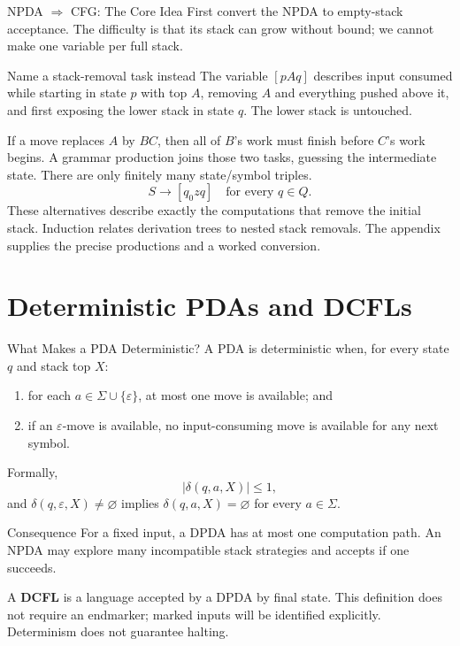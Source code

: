 \documentclass[10pt]{beamer}
\begin{document}
\begin{frame}{NPDA $\Rightarrow$ CFG: The Core Idea}
  \small
  First convert the NPDA to empty-stack acceptance. The difficulty is that
  its stack can grow without bound; we cannot make one variable per full stack.
  \begin{block}{Name a stack-removal task instead}
    The variable $[pAq]$ describes input consumed while starting in state $p$
    with top $A$, removing $A$ and everything pushed above it, and first
    exposing the lower stack in state $q$. The lower stack is untouched.
  \end{block}
  \pause
  If a move replaces $A$ by $BC$, then all of $B$'s work must finish before
  $C$'s work begins. A grammar production joins those two tasks, guessing
  the intermediate state. There are only finitely many state/symbol triples.
  \pause
  \[
    S\to[q_0zq]\quad\text{for every }q\in Q.
  \]
  These alternatives describe exactly the computations that remove the
  initial stack. Induction relates derivation trees to nested stack removals.
  The appendix supplies the precise productions and a worked conversion.
\end{frame}

\section{Deterministic PDAs and DCFLs}

\begin{frame}{What Makes a PDA Deterministic?}
  \small
  A PDA is deterministic when, for every state $q$ and stack top $X$:
  \begin{enumerate}
    \item for each $a\in\Sigma\cup\{\varepsilon\}$, at most one move is available; and
    \item if an $\varepsilon$-move is available, no input-consuming move is available for any next symbol.
  \end{enumerate}
  \pause
  Formally,
  \[
    |\delta(q,a,X)|\le1,
  \]
  and $\delta(q,\varepsilon,X)\ne\varnothing$ implies
  $\delta(q,a,X)=\varnothing$ for every $a\in\Sigma$.
  \pause
  \begin{block}{Consequence}
    For a fixed input, a DPDA has at most one computation path. An NPDA may explore many incompatible
    stack strategies and accepts if one succeeds.
  \end{block}
  A \textbf{DCFL} is a language accepted by a DPDA by final state.
  This definition does not require an endmarker; marked inputs will be
  identified explicitly. Determinism does not guarantee halting.
\end{frame}
\end{document}
